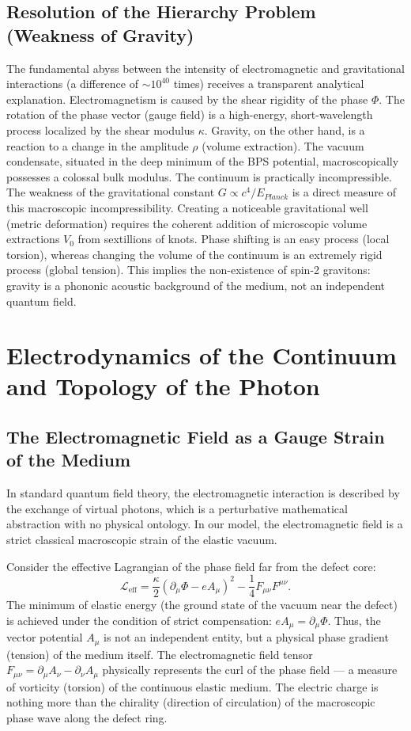 \documentclass[12pt,a4paper]{article}
\begin{document}
\subsection{Resolution of the Hierarchy Problem (Weakness of Gravity)}
The fundamental abyss between the intensity of electromagnetic and gravitational interactions (a difference of $\sim 10^{40}$ times) receives a transparent analytical explanation.
Electromagnetism is caused by the shear rigidity of the phase $\Phi$. The rotation of the phase vector (gauge field) is a high-energy, short-wavelength process localized by the shear modulus $\kappa$.
Gravity, on the other hand, is a reaction to a change in the amplitude $\rho$ (volume extraction). The vacuum condensate, situated in the deep minimum of the BPS potential, macroscopically possesses a colossal bulk modulus. The continuum is practically incompressible.
The weakness of the gravitational constant $G \propto c^4 / E_{Planck}$ is a direct measure of this macroscopic incompressibility. Creating a noticeable gravitational well (metric deformation) requires the coherent addition of microscopic volume extractions $V_0$ from sextillions of knots. Phase shifting is an easy process (local torsion), whereas changing the volume of the continuum is an extremely rigid process (global tension). This implies the non-existence of spin-2 gravitons: gravity is a phononic acoustic background of the medium, not an independent quantum field.

\section{Electrodynamics of the Continuum and Topology of the Photon}

\subsection{The Electromagnetic Field as a Gauge Strain of the Medium}
In standard quantum field theory, the electromagnetic interaction is described by the exchange of virtual photons, which is a perturbative mathematical abstraction with no physical ontology. In our model, the electromagnetic field is a strict classical macroscopic strain of the elastic vacuum.

Consider the effective Lagrangian of the phase field far from the defect core:
\begin{equation}
	\mathcal{L}_{\text{eff}} = \frac{\kappa}{2} (\partial_\mu \Phi - e A_\mu)^2 - \frac{1}{4} F_{\mu\nu} F^{\mu\nu}.
\end{equation}
The minimum of elastic energy (the ground state of the vacuum near the defect) is achieved under the condition of strict compensation: $e A_\mu = \partial_\mu \Phi$. Thus, the vector potential $A_\mu$ is not an independent entity, but a physical phase gradient (tension) of the medium itself. The electromagnetic field tensor $F_{\mu\nu} = \partial_\mu A_\nu - \partial_\nu A_\mu$ physically represents the curl of the phase field — a measure of vorticity (torsion) of the continuous elastic medium. The electric charge is nothing more than the chirality (direction of circulation) of the macroscopic phase wave along the defect ring.
\end{document}
